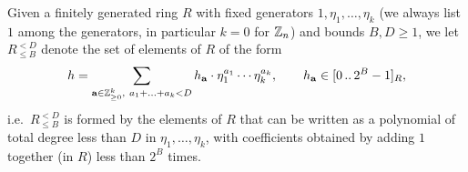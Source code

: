 Given a finitely generated ring $R$ with fixed generators $1,\eta_1,\ldots,\eta_k$ (we always list $1$ among the generators, in particular $k=0$ for $\mathbb{Z}_n$) and bounds $B, D\geq 1$, we let $R_{\leq B}^{<D}$ denote the set of elements of $R$ of the form 
$$
h=\sum_{\aa\in \ZZ_{\geq 0}^k,\ a_1+\ldots+a_k<D} h_{\aa}\cdot \eta_1^{a_1}\cdots\eta_k^{a_k}, \qquad h_{\aa}\in \range{0}{2^B-1}_R,
$$
 i.e.\  $R_{\leq B}^{<D}$ is formed by the elements of $R$ that can be written as a polynomial of total degree less than $D$ in $\eta_1,\ldots, \eta_k$, with coefficients obtained by adding $1$ together (in $R$) less than $2^B$ times. 






 

